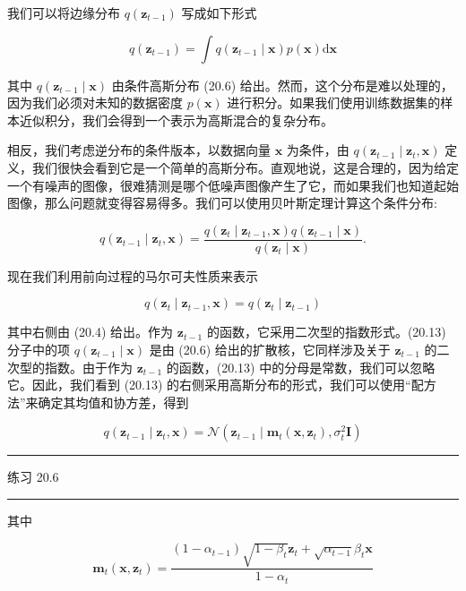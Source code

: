 \documentclass[10pt]{article}
\newcommand{\HRule}{\begin{center}\rule{0.9\linewidth}{0.2mm}\end{center}}
\begin{document}
我们可以将边缘分布 \(q\left( {\mathbf{z}}_{t - 1}\right)\) 写成如下形式

\[
q\left( {\mathbf{z}}_{t - 1}\right)  = \int q\left( {{\mathbf{z}}_{t - 1} \mid  \mathbf{x}}\right) p\left( \mathbf{x}\right) \mathrm{d}\mathbf{x} \tag{20.12}
\]

其中 \(q\left( {{\mathbf{z}}_{t - 1} \mid  \mathbf{x}}\right)\) 由条件高斯分布 (20.6) 给出。然而，这个分布是难以处理的，因为我们必须对未知的数据密度 \(p\left( \mathbf{x}\right)\) 进行积分。如果我们使用训练数据集的样本近似积分，我们会得到一个表示为高斯混合的复杂分布。

相反，我们考虑逆分布的条件版本，以数据向量 \(\mathbf{x}\) 为条件，由 \(q\left( {{\mathbf{z}}_{t - 1} \mid  {\mathbf{z}}_{t},\mathbf{x}}\right)\) 定义，我们很快会看到它是一个简单的高斯分布。直观地说，这是合理的，因为给定一个有噪声的图像，很难猜测是哪个低噪声图像产生了它，而如果我们也知道起始图像，那么问题就变得容易得多。我们可以使用贝叶斯定理计算这个条件分布:

\[
q\left( {{\mathbf{z}}_{t - 1} \mid  {\mathbf{z}}_{t},\mathbf{x}}\right)  = \frac{q\left( {{\mathbf{z}}_{t} \mid  {\mathbf{z}}_{t - 1},\mathbf{x}}\right) q\left( {{\mathbf{z}}_{t - 1} \mid  \mathbf{x}}\right) }{q\left( {{\mathbf{z}}_{t} \mid  \mathbf{x}}\right) }. \tag{20.13}
\]

现在我们利用前向过程的马尔可夫性质来表示

\[
q\left( {{\mathbf{z}}_{t} \mid  {\mathbf{z}}_{t - 1},\mathbf{x}}\right)  = q\left( {{\mathbf{z}}_{t} \mid  {\mathbf{z}}_{t - 1}}\right)  \tag{20.14}
\]

其中右侧由 (20.4) 给出。作为 \({\mathbf{z}}_{t - 1}\) 的函数，它采用二次型的指数形式。(20.13) 分子中的项 \(q\left( {{\mathbf{z}}_{t - 1} \mid  \mathbf{x}}\right)\) 是由 (20.6) 给出的扩散核，它同样涉及关于 \({\mathbf{z}}_{t - 1}\) 的二次型的指数。由于作为 \({\mathbf{z}}_{t - 1}\) 的函数，(20.13) 中的分母是常数，我们可以忽略它。因此，我们看到 (20.13) 的右侧采用高斯分布的形式，我们可以使用“配方法”来确定其均值和协方差，得到

\[
q\left( {{\mathbf{z}}_{t - 1} \mid  {\mathbf{z}}_{t},\mathbf{x}}\right)  = \mathcal{N}\left( {{\mathbf{z}}_{t - 1} \mid  {\mathbf{m}}_{t}\left( {\mathbf{x},{\mathbf{z}}_{t}}\right) ,{\sigma }_{t}^{2}\mathbf{I}}\right)  \tag{20.15}
\]

\HRule

练习 20.6

\HRule

其中

\[
{\mathbf{m}}_{t}\left( {\mathbf{x},{\mathbf{z}}_{t}}\right)  = \frac{\left( {1 - {\alpha }_{t - 1}}\right) \sqrt{1 - {\beta }_{t}}{\mathbf{z}}_{t} + \sqrt{{\alpha }_{t - 1}}{\beta }_{t}\mathbf{x}}{1 - {\alpha }_{t}} \tag{20.16}
\]
\end{document}
